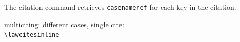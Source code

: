 The citation command retrieves \texttt{casenameref} for each key in the citation.
\bigskip

\noindent
\theball
multiciting: different cases, single cite: \\
\verb|\lawcitesinline|
\bigskip


\renewcommand\democodeprefix{{\small syntax:} }
\renewcommand{\demoresultprefix}{\noindent {\small output:}}


\begin{filecontents}{\democodefile}
\end{filecontents}
\PrintCodeAndResultsStackedR
%

